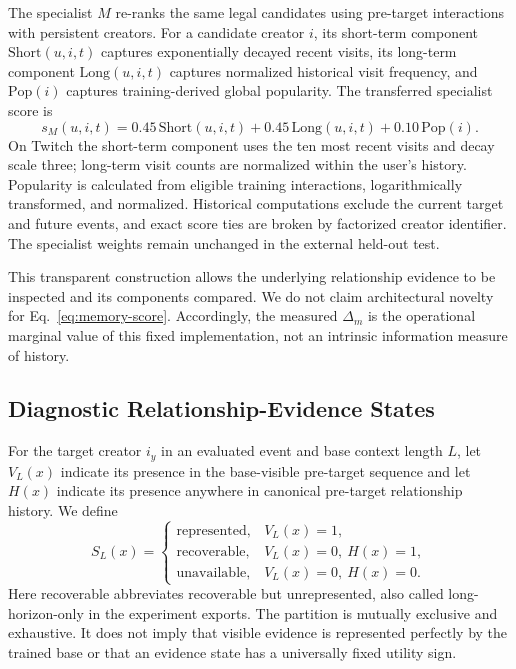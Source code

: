 The specialist $M$ re-ranks the same legal candidates using pre-target interactions with persistent creators. For a candidate creator $i$, its short-term component $\mathrm{Short}(u,i,t)$ captures exponentially decayed recent visits, its long-term component $\mathrm{Long}(u,i,t)$ captures normalized historical visit frequency, and $\mathrm{Pop}(i)$ captures training-derived global popularity. The transferred specialist score is
\begin{equation}
s_M(u,i,t)=0.45\,\mathrm{Short}(u,i,t)
           +0.45\,\mathrm{Long}(u,i,t)
           +0.10\,\mathrm{Pop}(i).
\label{eq:memory-score}
\end{equation}
On Twitch the short-term component uses the ten most recent visits and decay scale three; long-term visit counts are normalized within the user's history. Popularity is calculated from eligible training interactions, logarithmically transformed, and normalized. Historical computations exclude the current target and future events, and exact score ties are broken by factorized creator identifier. The specialist weights remain unchanged in the external held-out test.

This transparent construction allows the underlying relationship evidence to be inspected and its components compared. We do not claim architectural novelty for Eq.~\eqref{eq:memory-score}. Accordingly, the measured $\Delta_m$ is the operational marginal value of this fixed implementation, not an intrinsic information measure of history.

\subsection{Diagnostic Relationship-Evidence States}
\label{sec:evidence-states}

For the target creator $i_y$ in an evaluated event and base context length $L$, let $V_L(x)$ indicate its presence in the base-visible pre-target sequence and let $H(x)$ indicate its presence anywhere in canonical pre-target relationship history. We define
\begin{equation}
S_L(x)=
\begin{cases}
\mathrm{represented},&V_L(x)=1,\\
\mathrm{recoverable},&V_L(x)=0,\ H(x)=1,\\
\mathrm{unavailable},&V_L(x)=0,\ H(x)=0.
\end{cases}
\label{eq:relationship-states}
\end{equation}
Here recoverable abbreviates recoverable but unrepresented, also called long-horizon-only in the experiment exports. The partition is mutually exclusive and exhaustive. It does not imply that visible evidence is represented perfectly by the trained base or that an evidence state has a universally fixed utility sign.

